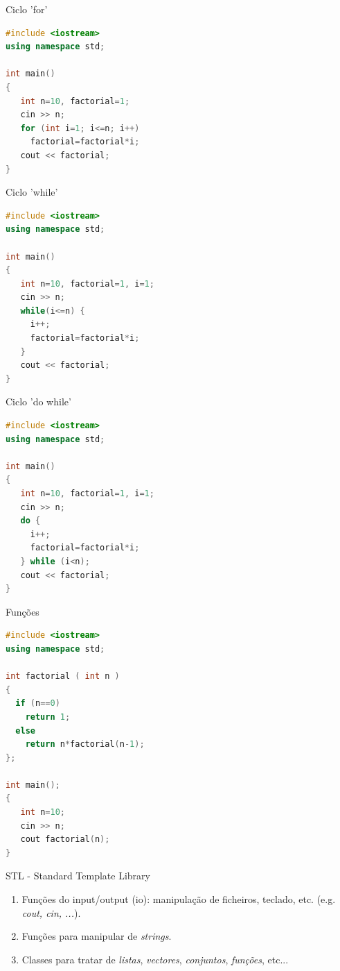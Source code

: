 \documentclass[hyperref={colorlinks=true}]{beamer}
\begin{document}
\begin{frame}[fragile]{Ciclo 'for'}

\begin{lstlisting}[language=C++]
#include <iostream>
using namespace std;

int main() 
{
   int n=10, factorial=1;  
   cin >> n;
   for (int i=1; i<=n; i++) 
     factorial=factorial*i;
   cout << factorial;
}
\end{lstlisting}

\end{frame}

\begin{frame}[fragile]{Ciclo 'while'}

\begin{lstlisting}[language=C++]
#include <iostream>
using namespace std;

int main() 
{
   int n=10, factorial=1, i=1;
   cin >> n;
   while(i<=n) { 
     i++;
     factorial=factorial*i;
   }
   cout << factorial;
}
\end{lstlisting}

\end{frame}

\begin{frame}[fragile]{Ciclo 'do while'}

\begin{lstlisting}[language=C++]
#include <iostream>
using namespace std;

int main() 
{
   int n=10, factorial=1, i=1;
   cin >> n;
   do { 
     i++;
     factorial=factorial*i;
   } while (i<n);   
   cout << factorial;
}
\end{lstlisting}

\end{frame}


\begin{frame}[fragile]{Funções}

\begin{lstlisting}[language=C++]
#include <iostream>
using namespace std;

int factorial ( int n )
{
  if (n==0)
    return 1;
  else 
    return n*factorial(n-1);
};

int main();
{
   int n=10;
   cin >> n;
   cout factorial(n);
}
\end{lstlisting}

\end{frame}


\begin{frame}{STL - Standard Template Library}

\begin{enumerate}
 \item Funções do input/output (io): manipulação de ficheiros, teclado, etc. (e.g. {\it cout, cin, ...}).
 \item Funções para manipular de {\it strings}.
 \item Classes para tratar de {\it listas}, {\it vectores}, {\it conjuntos}, {\it funções}, etc...
\end{enumerate}


\end{frame}
\end{document}
